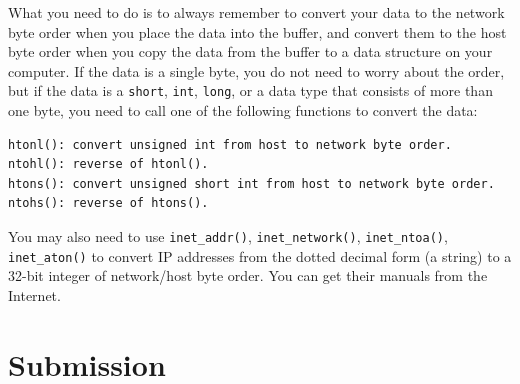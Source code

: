 What you need to do is to always remember to convert your data to the
network byte order when you place the data into the buffer, and convert
them to the host byte order when you copy the data from the buffer to 
a data structure on your computer. If the data is a single byte, you do not
need to worry about the order, but if the data is a {\tt short}, 
{\tt int}, {\tt long}, or a data type that consists of more than one byte, 
you need to call one of the following functions to convert the data:

\begin{lstlisting}
htonl(): convert unsigned int from host to network byte order.
ntohl(): reverse of htonl().
htons(): convert unsigned short int from host to network byte order.
ntohs(): reverse of htons().
\end{lstlisting}


You may also need to use {\tt inet\_addr()}, {\tt inet\_network()},
{\tt inet\_ntoa()}, {\tt inet\_aton()} to convert 
IP addresses from the dotted decimal form (a string) to a
32-bit integer of network/host byte order. You can get their 
manuals from the Internet.


 

\section{Submission}

\seedsubmission 






